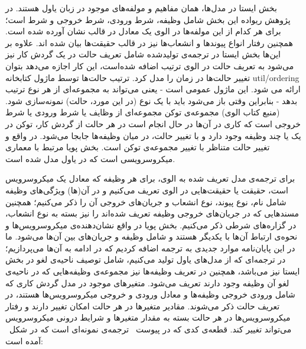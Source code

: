 بخش ایستا در مدل‌ها، همان مفاهیم و مولفه‌های موجود در زبان یاول هستند. در پژوهش ریواده این بخش شامل وظیفه، شرط ورودی، شرط خروجی و شرط است؛ 
برای هر کدام از این مولفه‌ها در الوی یک معادل در قالب نشان آورده شده است. همچنین رفتار انواع پیوندها و انشعاب‌ها نیز در قالب حقیقت‌ها بیان شده اند. 
علاوه بر این‌ها بخش ایستا در ترجمه‌ی تولید‌شده شامل تعریف حالت در یک گردش کار نیز می‌شود به تعریف حالت در الوی ترتیب اضافه شده‌است، 
این کار اجازه می‌دهد بتوان تغییر حالت‌ها در زمان را مدل کرد. ترتیب حالت‌ها توسط ماژول کتابخانه util/ordering ارائه می شود. این ماژول عمومی است - یعنی می‌تواند به مجموعه‌ای از هر نوع ترتیب بدهد - بنابراین وقتی باز می‌شود باید با یک نوع (در این مورد، حالت) نمونه‌سازی شود. (منبع کتاب الوی)
مجموعه‌ی توکن مجموعه‌ای از وظایف یا شرط ورودی یا شرط خروجی است که کاری در آن‌ها در حال انجام است در هر حالت از گردش کار، توکن در یک یا چند وظیفه وجود دارد و با تغییر حالت، در میان وظیفه‌ها جابجا می‌شود. در واقع و تغییر حالت متناظر با تغییر مجموعه‌ی توکن است. 
بخش پویا مرتبط با معماری میکروسرویسی است که در یاول مدل شده است. 

برای ترجمه‌ی مدل تعریف شده به الوی، برای هر وظیفه که معادل یک میکروسرویس است، حقیقت یا حقیقت‌هایی در الوی تعریف می‌کنیم و در آن(ها) ویژگی‌های وظیفه شامل نام، نوع پیوند، نوع انشعاب و جریان‌های خروجی آن را ذکر می‌کنیم؛ 
همچنین مسندهایی که در جریان‌های خروجی وظیفه تعریف شده‌اند را نیز بسته به نوع انشعاب، در گزاره‌های شرطی ذکر می‌کنیم. 
بخش‌ پویا در واقع نشان‌دهنده‌ی میکروسرویس‌ها و نحوه‌ی ارتباط آن‌ها با یکدیگر هستند و شامل وظیفه و جریان‌های بین آن‌ها می‌شود. 
ما در این پایان‌نامه موارد جدیدی به ترجمه اضافه کردیم که در ادامه به آن‌ها می‌پردازیم؛ در ترجمه‌ای که از مدل‌های یاول تولید می‌کنیم، شامل توصیف ناحیه‌ی لغو در بخش ایستا نیز می‌باشد، 
همچنین در تعریف وظیفه‌ها نیز مجموعه‌ی وظیفه‌هایی که در ناحیه‌ی لغو آن وظیفه وجود دارند تعریف می‌شود. 
متغیرهای موجود در مدل گردش کاری که شامل ورودی خروجی وظیفه‌ها و معادل ورودی و خروجی میکروسرویس‌ها هستند، در تعریف حالت ذکر می‌شوند. 
مقادیر متغیرها در هر حالت امکان تغییر دارند و رفتار میکروسرویس‌ها در هر حالت بسته به مقدار متغیرها و شرایط درونی میکروسرویس می‌تواند تغییر کند.
قطعه‌ی کدی که در پیوست~ ترجمه‌ی نمونه‌‌ای است که در شکل~ آمده است: 

  
  
